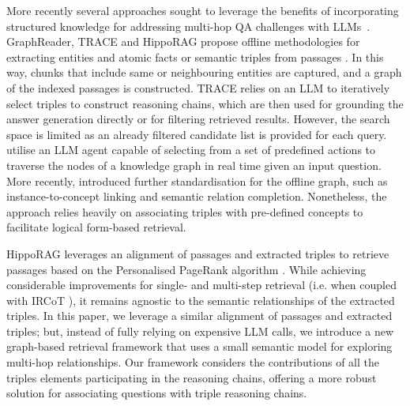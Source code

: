 More recently several approaches sought to leverage the benefits of incorporating structured knowledge for addressing multi-hop QA challenges with LLMs~\cite{Park2023,Fang2024,Li2024,Gutierrez2024,Liang2024,Wang2024}.
GraphReader, TRACE and HippoRAG propose offline methodologies for extracting entities and atomic facts or semantic triples from passages \cite{Li2024,Fang2024,Gutierrez2024}.
In this way, chunks that include same or neighbouring entities are captured, and a graph of the indexed passages is constructed. 
TRACE relies on an LLM to iteratively select triples to construct reasoning chains, which are then used for grounding the answer generation directly or for filtering retrieved results. However, the search space is limited as an already filtered candidate list is provided for each query. \citeauthor{Li2024} utilise an LLM agent capable of selecting from a set of predefined actions to traverse the nodes of a knowledge graph in real time given an input question. More recently, \citeauthor{Liang2024} introduced further standardisation for the offline graph, such as instance-to-concept linking and semantic relation completion. Nonetheless, the approach relies heavily on associating triples with pre-defined concepts to facilitate logical form-based retrieval.


HippoRAG leverages an alignment of passages and extracted triples to retrieve passages based on the Personalised PageRank algorithm \cite{Gutierrez2024}. 
While achieving considerable improvements for single- and multi-step retrieval (i.e. when coupled with IRCoT \cite{Trivedi2023}), it remains agnostic to the semantic relationships of the extracted triples. In this paper, we leverage a similar alignment of passages and extracted triples; but, instead of fully relying on expensive LLM calls, we introduce a new graph-based retrieval framework that uses a small semantic model for exploring multi-hop relationships. 
Our framework considers the contributions of all the triples elements participating in the reasoning chains, offering a more robust solution for associating questions with triple reasoning chains.
